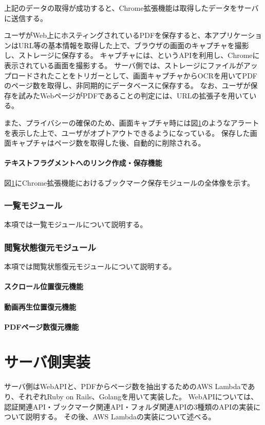 上記のデータの取得が成功すると、Chrome拡張機能は取得したデータをサーバに送信する。

ユーザがWeb上にホスティングされているPDFを保存すると、本アプリケーションはURL等の基本情報を取得した上で、ブラウザの画面のキャプチャを撮影し、ストレージに保存する。
キャプチャには、というAPIを利用し、Chromeに表示されている画面を撮影する。
サーバ側では、ストレージにファイルがアップロードされたことをトリガーとして、画面キャプチャからOCRを用いてPDFのページ数を取得し、非同期的にデータベースに保存する。
なお、ユーザが保存を試みたWebページがPDFであることの判定には、URLの拡張子を用いている。

また、プライバシーの確保のため、画面キャプチャ時には図\ref{}のようなアラートを表示した上で、ユーザがオプトアウトできるようになっている。
保存した画面キャプチャはページ数を取得した後、自動的に削除される。

\paragraph{テキストフラグメントへのリンク作成・保存機能}

図\ref{}にChrome拡張機能におけるブックマーク保存モジュールの全体像を示す。

\subsubsection{一覧モジュール}
本項では一覧モジュールについて説明する。

\subsubsection{閲覧状態復元モジュール}
本項では閲覧状態復元モジュールについて説明する。

\paragraph{スクロール位置復元機能}


\paragraph{動画再生位置復元機能}


\paragraph{PDFページ数復元機能}


\section{サーバ側実装}
サーバ側はWebAPIと、PDFからページ数を抽出するためのAWS Lambdaであり、それぞれRuby on Rails、Golangを用いて実装した。
WebAPIについては、認証関連API・ブックマーク関連API・フォルダ関連APIの3種類のAPIの実装について説明する。
その後、AWS Lambdaの実装について述べる。

